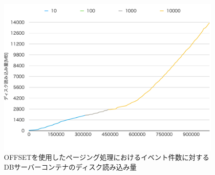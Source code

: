 \documentclass[../../../../../main]{subfiles}
\begin{document}
    \begin{figure}[H]
        \centering
        \includegraphics[width=12cm]{graph}
        \caption{OFFSETを使用したページング処理におけるイベント件数に対するDBサーバーコンテナのディスク読み込み量}
        \label{fig:paging-offset-db-disk-out-app_1_1024-db_1_1024}
    \end{figure}
\end{document}
